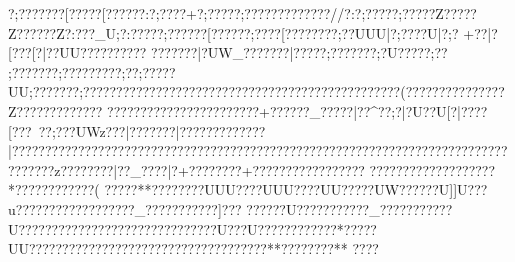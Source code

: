 {{{{{{{{{{{{{{{{{{{{{{{{{{{{{{{{{{{{{{{{{{{{{{{{{{{{{{{{{{{{{{{{{{{{{{{{{{{{{{{{{{{{{{{{{{{{{{{{{{{{{{{{{{{{{{{{{{{{{{{{{{{{{{{{{{{{{{{{{{{{{{{{{{{{{{{{{{{{{{{{{{{{{{{{{{{{{{{{{{{{{{{{{{{{{{{{{{{{{{{{{{{{{{{{{{{{{{{{{{{{{{{{{{{{{{{{{{{{{{{{{{{{{{{{{{{{{{{{{{{{{{{{{{{{{{{{{{{{{{{{{{{{{{{{{{{{{{{{{{{{{{{{{{{{{{{{{{{{{{{{{{{{{{{{{{{{{{{{{{{{{{{{{{{{{{{{{{{{{{{{{{{{{{{{{{{{{{{{{{{{{{{{{{{{{{{{{{{{{{{{{{{{{{{{{{{{{{{{{{{{{{{{{{{{{{{{{{{{{{{{{{{{{{{{{{{{{{{{{{{{{{{{{{{{{{{{{{{{{{{{{{{{{{{{{{{{{{{{{{{{{{{{{{{{{{{{{{{{{{{{{{{{{{{{{{{{{{{{{{{{{{{{{{{{{{{{{{{{{{{{{{{{{{{{{{{{{{{{{{{{{{{{{{{{{{{{{{{{{{{{{{{{{{{{{{{{{{{{{{{{{{{{{{{{{{{{{{{{{{{{{{{{{{{{{{{{{{{{{{{{{{{{{{{{{{{{{{{{{{{{{{{{{{{{{{{{{{{{{{{{{{{{{{{{{{{{{{{{{{{{{{{{{{{{{{{{{{{{{{{{{{{{{{{{{{{{{{{{{{{{{{{{{{{{{{{{{{{{{{{{{{{{{{{{{{{{{{{{{{{{{{{{{{{{{{{{{{{{{{{{{{{{{{{{{{{{{{{{{{{{{{{{{{{{{{{{{{{{{{{{{{{{{{{{{{{{{{{{{{{{{{{{{{{{{{{{{{{{{{{{{{{{{{{{{{{{{{{{{{{{{{{{{{{{{{{{{{{{{{{{{{{{{{{{{{{{{{{{{{{{{{{{{{{{{{{{{{{{{{{{{{{{{{{{{{{{{{{{{{{{{{{{{{{{{{{{{{{{{{{{{{{{{{{{{{{{{{{{{{{{{{{{{{{{{{{{{{{{{{{{{{{{{{{{{{{{{{{{{{{{{{{{{{{{{{{{{{{{{{{{{{{{{{{{{{{{{{{{{{{{{{{{{{{{{{{{{{{{{{{{{{{{{{{{{{{{{{{{{{{{{{{{{{{{{{{{{{{{{{{{{{{{{{{{{{{{{{{{{{{{{{{{{{{{{{{{{{{{{{{{{{{{{{{{{{{{{{{{{{{{{{{{{{{{{{{{{{{{{{{{{{{{{{{{{{{{{{{{{{{{{{{{{{{{{{{{{{{{{{{{{{{{{{{{{{{{{{{{{{{{{{{{{{{{{{{{{{{{{{{{{{{{{{{{{{{{{{{{{{{{{{{{{{{{{{{{{{{{{{{{{{{{{{{{{{{{{{{{{{{{{{{{{{{{?;???????[?????[??????:?;????+?;???? ?;?????????????//?:?;? ????;?????Z?????Z??????Z?:???_U;?:?????;??????[??????;???? [????????;??UUU|?;????U|?;?
+??|?[?  ??[?|??UU??\??????\????
??\??????|?UW_???????|???  ??;???????;?U?????;??
  ;???????;?????????;??   ;?????UU;???????;????????????????????????????????????????????????(???????????????Z?????????????
???????????????????????+? ?????_?????|??^??;?|?U??U[?|????[???~? ?;???UWz???|???????|???????\???????|???????????????????????????????????????? ??????????????? ?????????????????????????}??z??\???????|??_????|?+????????+??????? ??????  ????
?  ??????  ?????? ??????*??????? ?????(
 ?????** ????    ????UUU????UUU????UU?????UW??????U]]U???u??????????????????_???????????]???  ??????U??   ?????????_??????}?????U??????????????????????????????U???U?}???????????*?????UU????????????????????????????????????**?????? ??**
 ???? }}}}}}}}}}}}}}}}}}}}}}}}}}}}}}}}}}}}}}}}}}}}}}}}}}}}}}}}}}}}}}}}}}}}}}}}}}}}}}}}}}}}}}}}}}}}}}}}}}}}}}}}}}}}}}}}}}}}}}}}}}}}}}}}}}}}}}}}}}}}}}}}}}}}}}}}}}}}}}}}}}}}}}}}}}}}}}}}}}}}}}}}}}}}}}}}}}}}}}}}}}}}}}}}}}}}}}}}}}}}}}}}}}}}}}}}}}}}}}}}}}}}}}}}}}}}}}}}}}}}}}}}}}}}}}}}}}}}}}}}}}}}}}}}}}}}}}}}}}}}}}}}}}}}}}}}}}}}}}}}}}}}}}}}}}}}}}}}}}}}}}}}}}}}}}}}}}}}}}}}}}}}}}}}}}}}}}}}}}}}}}}}}}}}}}}}}}}}}}}}}}}}}}}}}}}}}}}}}}}}}}}}}}}}}}}}}}}}}}}}}}}}}}}}}}}}}}}}}}}}}}}}}}}}}}}}}}}}}}}}}}}}}}}}}}}}}}}}}}}}}}}}}}}}}}}}}}}}}}}}}}}}}}}}}}}}}}}}}}}}}}}}}}}}}}}}}}}}}}}}}}}}}}}}}}}}}}}}}}}}}}}}}}}}}}}}}}}}}}}}}}}}}}}}}}}}}}}}}}}}}}}}}}}}}}}}}}}}}}}}}}}}}}}}}}}}}}}}}}}}}}}}}}}}}}}}}}}}}}}}}}}}}}}}}}}}}}}}}}}}}}}}}}}}}}}}}}}}}}}}}}}}}}}}}}}}}}}}}}}}}}}}}}}}}}}}}}}}}}}}}}}}}}}}}}}}}}}}}}}}}}}}}}}}}}}}}}}}}}}}}}}}}}}}}}}}}}}}}}}}}}}}}}}}}}}}}}}}}}}}}}}}}}}}}}}}}}}}}}}}}}}}}}}}}}}}}}}}}}}}}}}}}}}}}}}}}}}}}}}}}}}}}}}}}}}}}}}}}}}}}}}}}}}}}}}}}}}}}}}}}}}}}}}}}}}}}}}}}}}}}}}}}}}}}}}}}}}}}}}}}}}}}}}}}}}}}}}}}}}}}}}}}}}}}}}}}}}}}}}}}}}}}}}}}}}}}}}}}}}}}}}}}}}}}}}}}}}}}}}}}}}}}}}}}}}}}}}}}}}}}}}}}}}}}}}}}}}}}}}}}}}}}}}}}}}}}}}}}}}}}}}}}}}}}}}}}}}}}}}}}}}}}}}}}}}}}}}}}}}}}}}}}}}}}}}}}}}}}}}}}}}}}}}}}}}}}}}}}}}}}}}}}}}}}}}}}}}}}}}}}}}}}}}}}}}}}}}}}}}}}}}}}}}}}}}}}}}}}}}}}}}}}}}}}}}}}}}}}}}}}}}}}}}}}}}}}}}}}}}}}}}}}}}}}}}}}}}}}}}}}}}}}}}}}}}}}}}}}}}}}}}}}}}}}}}}}}}}}}}}}}}}}}}}}}}}}}}}}}}}}}}}}}}}}}}}}}}}}}}}}}}}}

